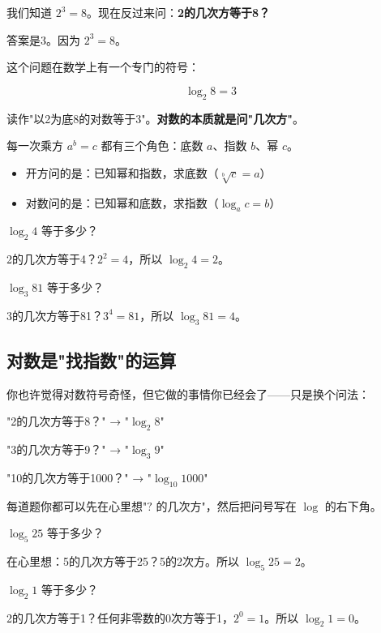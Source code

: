 我们知道 $2^3=8$。现在反过来问：\textbf{2的几次方等于8？}

答案是3。因为 $2^3=8$。

这个问题在数学上有一个专门的符号：

\[
\log_2 8 = 3
\]

读作"以2为底8的对数等于3"。\textbf{对数的本质就是问"几次方"}。

每一次乘方 $a^b=c$ 都有三个角色：底数 $a$、指数 $b$、幂 $c$。
\begin{itemize}
  \item 开方问的是：已知幂和指数，求底数（$\sqrt[b]{c}=a$）
  \item 对数问的是：已知幂和底数，求指数（$\log_a c = b$）
\end{itemize}

\begin{example}
$\log_2 4$ 等于多少？
\end{example}
\begin{solution}
2的几次方等于4？$2^2=4$，所以 $\log_2 4 = 2$。
\end{solution}

\begin{example}
$\log_3 81$ 等于多少？
\end{example}
\begin{solution}
3的几次方等于81？$3^4=81$，所以 $\log_3 81 = 4$。
\end{solution}

\subsection*{对数是"找指数"的运算}

你也许觉得对数符号奇怪，但它做的事情你已经会了——只是换个问法：

"2的几次方等于8？" → "$\log_2 8$"

"3的几次方等于9？" → "$\log_3 9$"

"10的几次方等于1000？" → "$\log_{10} 1000$"

每道题你都可以先在心里想"$?$ 的几次方"，然后把问号写在 $\log$ 的右下角。

\begin{example}
$\log_5 25$ 等于多少？
\end{example}
\begin{solution}
在心里想：5的几次方等于25？5的2次方。所以 $\log_5 25 = 2$。
\end{solution}

\begin{example}
$\log_2 1$ 等于多少？
\end{example}
\begin{solution}
2的几次方等于1？任何非零数的0次方等于1，$2^0=1$。所以 $\log_2 1 = 0$。
\end{solution}


